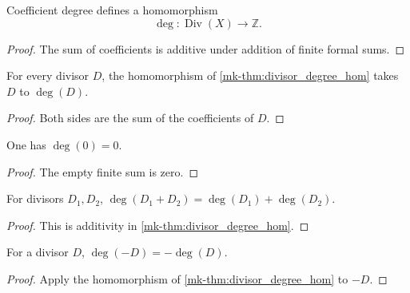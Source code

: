 \begin{theorem}
  \label{mk-thm:divisor_degree_hom}
  \leanok


  Coefficient degree defines a homomorphism
  \[
    \deg\colon\operatorname{Div}(X)\longrightarrow\mathbb Z.
  \]
\end{theorem}
\begin{proof}
  \leanok
  The sum of coefficients is additive under addition of finite formal sums.
\end{proof}

\begin{lemma}
  \label{mk-lem:degree_hom_apply}
  \leanok

  For every divisor \(D\), the homomorphism of
  \ref{mk-thm:divisor_degree_hom} takes \(D\) to \(\deg(D)\).
\end{lemma}
\begin{proof}
  \leanok
  Both sides are the sum of the coefficients of \(D\).
\end{proof}

\begin{lemma}
  \label{mk-lem:degree_zero}
  \leanok

  One has \(\deg(0)=0\).
\end{lemma}
\begin{proof}
  \leanok
  The empty finite sum is zero.
\end{proof}

\begin{lemma}
  \label{mk-lem:degree_add}
  \leanok

  For divisors \(D_1,D_2\),
  \(\deg(D_1+D_2)=\deg(D_1)+\deg(D_2)\).
\end{lemma}
\begin{proof}
  \leanok
  This is additivity in \ref{mk-thm:divisor_degree_hom}.
\end{proof}

\begin{lemma}
  \label{mk-lem:degree_neg}
  \leanok

  For a divisor \(D\), \(\deg(-D)=-\deg(D)\).
\end{lemma}
\begin{proof}
  \leanok
  Apply the homomorphism of \ref{mk-thm:divisor_degree_hom} to \(-D\).
\end{proof}

